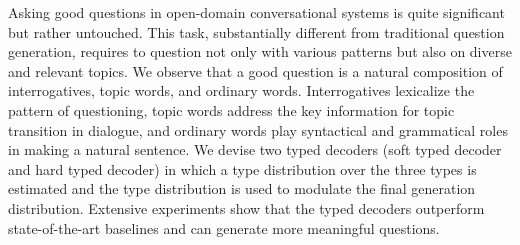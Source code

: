 Asking good questions in open-domain conversational systems is quite significant but rather untouched. This task, substantially different from traditional question generation, requires to question not only with various patterns but also on diverse and relevant topics. We observe that a good question is a natural composition of interrogatives, topic words, and ordinary words. Interrogatives lexicalize the pattern of questioning, topic words address the key information for topic transition in dialogue, and ordinary words play syntactical and grammatical roles in making a natural sentence. We devise two typed decoders (soft typed decoder and hard typed decoder) in which a type distribution over the three types is estimated and the type distribution is used to modulate the final generation distribution. Extensive experiments show that the typed decoders outperform state-of-the-art baselines and can generate more meaningful questions.
